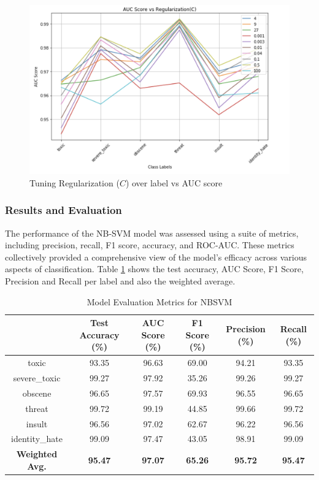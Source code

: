 \begin{figure}
    \centering
    \includegraphics[scale=0.5]{images/graphs/Reg_AUC.png}
    \caption{Tuning Regularization ($C$) over label vs AUC score}
    \label{fig:enter-label}
\end{figure}


\subsubsection{Results and Evaluation}
The performance of the NB-SVM model was assessed using a suite of metrics, including precision, recall, F1 score, accuracy, and ROC-AUC. These metrics collectively provided a comprehensive view of the model's efficacy across various aspects of classification.  Table \ref{tab:model_metrics_nbsvm} shows the test accuracy, AUC Score, F1 Score, Precision and Recall per label and also the weighted average.

\begin{table}[h]
\centering
\begin{tabular}{|c|c|c|c|c|c|}
\hline
 & Test Accuracy (\%) & AUC Score (\%) & F1 Score (\%) & Precision (\%) & Recall (\%) \\
\hline
toxic & 93.35 & 96.63 & 69.00 & 94.21 & 93.35 \\
severe\_toxic & 99.27 & 97.92 & 35.26 & 99.26 & 99.27 \\
obscene & 96.65 & 97.57 & 69.93 & 96.55 & 96.65 \\
threat & 99.72 & 99.19 & 44.85 & 99.66 & 99.72 \\
insult & 96.56 & 97.02 & 62.67 & 96.22 & 96.56 \\
identity\_hate & 99.09 & 97.47 & 43.05 & 98.91 & 99.09 \\
\hline
\textbf{Weighted Avg.} & \textbf{95.47} & \textbf{97.07} & \textbf{65.26} & \textbf{95.72} & \textbf{95.47} \\
\hline
\end{tabular}
\caption{Model Evaluation Metrics for NBSVM}
\label{tab:model_metrics_nbsvm}
\end{table}


